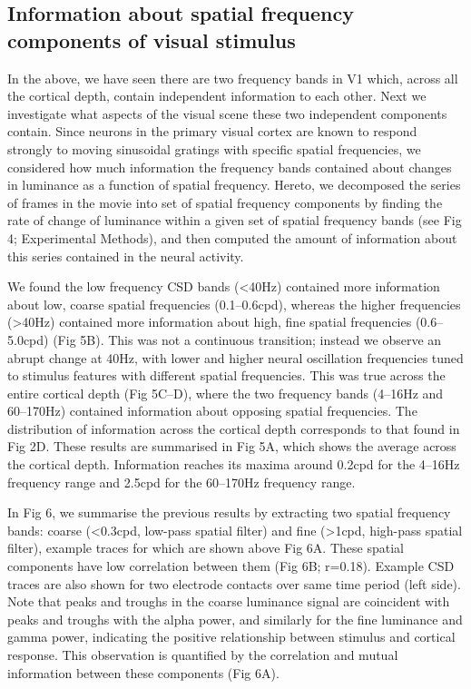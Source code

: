 \documentclass{article}
\begin{document}
\subsection{Information about spatial frequency components of visual stimulus}
In the above, we have seen there are two frequency bands in V1 which, across all the cortical depth, contain independent information to each other. Next we investigate what aspects of the visual scene these two independent components contain. Since neurons in the primary visual cortex are known to respond strongly to moving sinusoidal gratings with specific spatial frequencies, we considered how much information the frequency bands contained about changes in luminance as a function of spatial frequency. Hereto, we decomposed the series of frames in the movie into set of spatial frequency components by finding the rate of change of luminance within a given set of spatial frequency bands (see Fig 4; Experimental Methods), and then computed the amount of information about this series contained in the neural activity.

We found the low frequency CSD bands ({\textless}40Hz) contained more information about low, coarse spatial frequencies (0.1--0.6cpd), whereas the higher frequencies ({\textgreater}40Hz) contained more information about high, fine spatial frequencies (0.6--5.0cpd) (Fig 5B). This was not a continuous transition; instead we observe an abrupt change at 40Hz, with lower and higher neural oscillation frequencies tuned to stimulus features with different spatial frequencies. This was true across the entire cortical depth (Fig 5C--D), where the two frequency bands (4--16Hz and 60--170Hz) contained information about opposing spatial frequencies. The distribution of information across the cortical depth corresponds to that found in Fig 2D. These results are summarised in Fig 5A, which shows the average across the cortical depth. Information reaches its maxima around 0.2cpd for the 4--16Hz frequency range and 2.5cpd for the 60--170Hz frequency range.

In Fig 6, we summarise the previous results by extracting two spatial frequency bands: coarse ({\textless}0.3cpd, low-pass spatial filter) and fine ({\textgreater}1cpd, high-pass spatial filter), example traces for which are shown above Fig 6A. These spatial components have low correlation between them (Fig 6B; r=0.18). Example CSD traces are also shown for two electrode contacts over same time period (left side). Note that peaks and troughs in the coarse luminance signal are coincident with peaks and troughs with the alpha power, and similarly for the fine luminance and gamma power, indicating the positive relationship between stimulus and cortical response. This observation is quantified by the correlation and mutual information between these components (Fig 6A).
\end{document}
